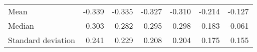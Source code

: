 \begin{tabular}{lllllll}
\multicolumn{1}{l}{\hspace{1em}Mean} &
  \multicolumn{1}{|r}{-0.339} &
  \multicolumn{1}{r}{-0.335} &
  \multicolumn{1}{r}{-0.327} &
  \multicolumn{1}{r}{-0.310} &
  \multicolumn{1}{r}{-0.214} &
  \multicolumn{1}{r}{-0.127} \\
\multicolumn{1}{l}{\hspace{1em}Median} &
  \multicolumn{1}{|r}{-0.303} &
  \multicolumn{1}{r}{-0.282} &
  \multicolumn{1}{r}{-0.295} &
  \multicolumn{1}{r}{-0.298} &
  \multicolumn{1}{r}{-0.183} &
  \multicolumn{1}{r}{-0.061} \\
\multicolumn{1}{l}{\hspace{1em}Standard deviation} &
  \multicolumn{1}{|r}{0.241} &
  \multicolumn{1}{r}{0.229} &
  \multicolumn{1}{r}{0.208} &
  \multicolumn{1}{r}{0.204} &
  \multicolumn{1}{r}{0.175} &
  \multicolumn{1}{r}{0.155} \\
\cline{1-7}
\end{tabular}
